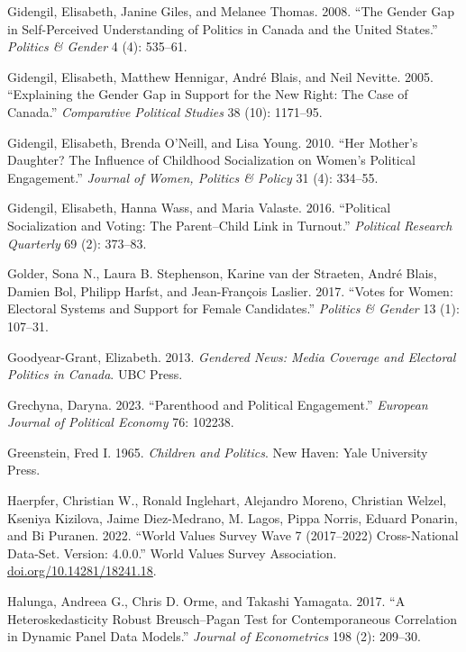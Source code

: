 \documentclass[
  letterpaper,
  DIV=11,
  numbers=noendperiod]{scrreprt}
\newlength{\cslhangindent}
\newenvironment{CSLReferences}[2] %
 {\begin{list}{}{%
  \setlength{\itemindent}{0pt}
  \setlength{\leftmargin}{0pt}
  \setlength{\parsep}{0pt}
  \ifodd #1
   \setlength{\leftmargin}{\cslhangindent}
   \setlength{\itemindent}{-1\cslhangindent}
  \fi
  \setlength{\itemsep}{#2\baselineskip}}}
 {\end{list}}
\begin{document}
\begin{CSLReferences}{1}{0}
Gidengil, Elisabeth, Janine Giles, and Melanee Thomas. 2008. {``{The
Gender Gap in Self-Perceived Understanding of Politics in Canada and the
United States}.''} \emph{Politics \& Gender} 4 (4): 535--61.

Gidengil, Elisabeth, Matthew Hennigar, André Blais, and Neil Nevitte.
2005. {``{Explaining the Gender Gap in Support for the New Right: The
Case of Canada}.''} \emph{Comparative Political Studies} 38 (10):
1171--95.

Gidengil, Elisabeth, Brenda O'Neill, and Lisa Young. 2010. {``{Her
Mother's Daughter? The Influence of Childhood Socialization on Women's
Political Engagement}.''} \emph{Journal of Women, Politics \& Policy} 31
(4): 334--55.

Gidengil, Elisabeth, Hanna Wass, and Maria Valaste. 2016. {``{Political
Socialization and Voting: The Parent--Child Link in Turnout}.''}
\emph{Political Research Quarterly} 69 (2): 373--83.

Golder, Sona N., Laura B. Stephenson, Karine van der Straeten, André
Blais, Damien Bol, Philipp Harfst, and Jean-François Laslier. 2017.
{``{Votes for Women: Electoral Systems and Support for Female
Candidates}.''} \emph{Politics \& Gender} 13 (1): 107--31.

Goodyear-Grant, Elizabeth. 2013. \emph{{Gendered News: Media Coverage
and Electoral Politics in Canada}}. UBC Press.

Grechyna, Daryna. 2023. {``{Parenthood and Political Engagement}.''}
\emph{European Journal of Political Economy} 76: 102238.

Greenstein, Fred I. 1965. \emph{{Children and Politics}}. New Haven:
Yale University Press.

Haerpfer, Christian W., Ronald Inglehart, Alejandro Moreno, Christian
Welzel, Kseniya Kizilova, Jaime Diez-Medrano, M. Lagos, Pippa Norris,
Eduard Ponarin, and Bi Puranen. 2022. {``{World Values Survey Wave 7
(2017--2022) Cross-National Data-Set. Version: 4.0.0}.''} World Values
Survey Association.
\href{https://doi.org/10.14281/18241.18}{doi.org/10.14281/18241.18}.

Halunga, Andreea G., Chris D. Orme, and Takashi Yamagata. 2017. {``{A
Heteroskedasticity Robust Breusch--Pagan Test for Contemporaneous
Correlation in Dynamic Panel Data Models}.''} \emph{Journal of
Econometrics} 198 (2): 209--30.


\end{CSLReferences}
\end{document}
